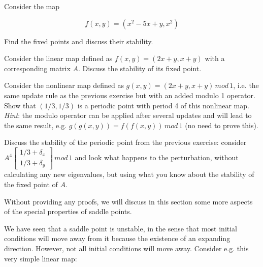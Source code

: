 \begin{exer}
Consider the map 

$$f(x,y) = (x^2-5x+y, x^2)$$

Find the fixed points and discuss their stability.
\end{exer}


\begin{exer}
Consider the linear map defined as $f(x,y) = (2x+y, x+y)$ with a corresponding matrix $A$. Discuss the stability of its fixed point.
\end{exer}

\begin{exer}
Consider the nonlinear map defined as $g(x,y) = (2x+y, x+y)\, mod \, 1$, i.e. the same update rule as the previous exercise but with an added modulo 1 operator. Show that $(1/3, 1/3)$ is a periodic point with period 4 of this nonlinear map.\\

\textit{Hint}: the modulo operator can be applied after several updates and will lead to the same result, e.g.  $g(g(x,y)) = f(f(x,y)) \, mod \, 1$ (no need to prove this).
\end{exer}

\begin{exer}
Discuss the stability of the periodic point from the previous exercise: consider $A^4 \begin{bmatrix} 1/3 + \delta_x \\ 1/3 + \delta_y \end{bmatrix} \, mod \, 1$ and look what happens to the perturbation, without calculating any new eigenvalues, but using what you know about the stability of the fixed point of $A$.
\end{exer}


\pagebreak


Without providing any proofs, we will discuss in this section some more aspects of the special properties of saddle points.

We have seen that a saddle point is unstable, in the sense that most initial conditions will move away from it because the existence of an expanding direction. However, not all initial conditions will move away. Consider e.g. this very simple linear map:

